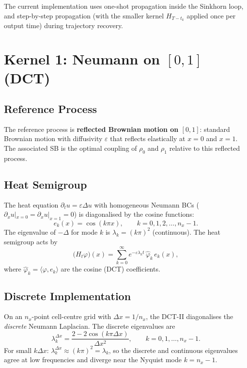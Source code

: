 \documentclass[11pt]{article}
\newcommand{\eps}{\varepsilon}
\newcommand{\dx}{\Delta x}
\theoremstyle{remark}
\begin{document}
The current implementation uses one-shot propagation inside the Sinkhorn loop,
and step-by-step propagation (with the smaller kernel $H_{T-t_k}$ applied once per
output time) during trajectory recovery.

\section{Kernel 1: Neumann on $[0,1]$ (DCT)}

\subsection{Reference Process}

The reference process is \textbf{reflected Brownian motion on $[0,1]$}: standard
Brownian motion with diffusivity $\eps$ that reflects elastically at $x = 0$ and $x = 1$.
The associated SB is the optimal coupling of $\rho_0$ and $\rho_1$ relative to this
reflected process.

\subsection{Heat Semigroup}

The heat equation $\partial_t u = \eps \Delta u$ with homogeneous Neumann BCs
($\partial_x u|_{x=0} = \partial_x u|_{x=1} = 0$) is diagonalised by the cosine functions:
\begin{equation}
  e_k(x) = \cos(k \pi x), \qquad k = 0, 1, 2, \ldots, n_x - 1.
\end{equation}
The eigenvalue of $-\Delta$ for mode $k$ is $\lambda_k = (k\pi)^2$ (continuous).
The heat semigroup acts by
\begin{equation}
  \bigl(H_t \varphi\bigr)(x)
  = \sum_{k=0}^{\infty} e^{-\eps \lambda_k t}\, \hat\varphi_k\, e_k(x),
\end{equation}
where $\hat\varphi_k = \langle \varphi, e_k \rangle$ are the cosine (DCT) coefficients.

\subsection{Discrete Implementation}

On an $n_x$-point cell-centre grid with $\dx = 1/n_x$, the DCT-II diagonalises the
\textit{discrete} Neumann Laplacian.
The discrete eigenvalues are
\begin{equation}
  \lambda_k^{\dx} = \frac{2 - 2\cos(k\pi\dx)}{\dx^2},
  \qquad k = 0, 1, \ldots, n_x - 1.
\end{equation}
For small $k\dx$: $\lambda_k^{\dx} \approx (k\pi)^2 = \lambda_k$, so the discrete and
continuous eigenvalues agree at low frequencies and diverge near the Nyquist mode
$k = n_x - 1$.
\end{document}
